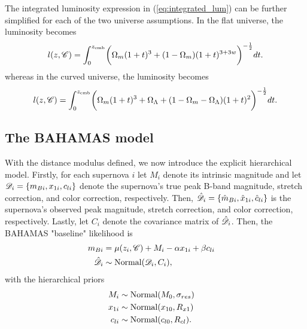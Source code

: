 The integrated luminosity expression in (\ref{eq:integrated_lum}) can be further simplified for each of the two universe assumptions. In the flat universe, the luminosity becomes
\begin{align}
l(z, \mathcal{C}) = \int_0^{z_{\text{cmb}}} \biggl( \Omega_m(1 + t)^3 + (1 - \Omega_m) (1 + t)^{3 + 3w} \biggr)^{-\frac{1}{2}} dt. \label{eq:integrated_lum_flat}
\end{align}
whereas in the curved universe, the luminosity becomes
\begin{align}
l(z, \mathcal{C}) = \int_0^{z_{\text{cmb}}} \biggl( \Omega_m(1 + t)^3 + \Omega_\Lambda + (1- \Omega_m - \Omega_\Lambda) (1 + t)^2 \biggr)^{-\frac{1}{2}} dt. \label{eq:integrated_lum_curv}
\end{align}

\subsection{The \citet{Shariff+others:2016} BAHAMAS model}
\label{subsec:ode_background_bahamas}

With the distance modulus defined, we now introduce the explicit hierarchical model. Firstly, for each supernova $i$ let $M_i$ denote its intrinsic magnitude and let $\mathcal{D}_i = \{ m_{Bi}, x_{1i}, c_{li} \}$ denote the supernova's true peak B-band magnitude, stretch correction, and color correction, respectively. Then, $\hat{\mathcal{D}}_i = \{ \hat{m}_{Bi}, \hat{x}_{1i}, \hat{c}_{li} \}$ is the supernova's observed peak magnitude, stretch correction, and color correction, respectively. Lastly, let $C_i$ denote the covariance matrix of $\hat{\mathcal{D}}_i$. Then, the BAHAMAS "baseline" likelihood is
\begin{align}
m_{Bi} &= \mu(z_i, \mathcal{C}) + M_i - \alpha x_{1i} + \beta c_{li} && \label{eq:baseline_likelihood} \\\nonumber
\hat{\mathcal{D}}_i &\sim \text{Normal}(\mathcal{D}_i, C_i),
\end{align}
with the hierarchical priors
\begin{align}
M_i &\sim \text{Normal}(M_0, \sigma_{res}) && \label{eq:baseline_hierprior} \\\nonumber
x_{1i} &\sim \text{Normal}(x_{10}, R_{x1}) && \\\nonumber
c_{li} &\sim \text{Normal}(c_{l0}, R_{cl}).
\end{align}

